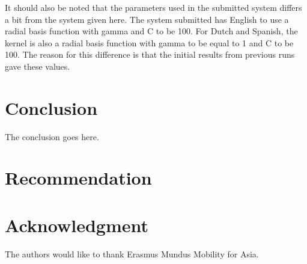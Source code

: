 \documentclass[conference]{IEEEtran}
\begin{document}
It should also be noted that the parameters used in the submitted system differs a bit from the system given here. The system submitted has English to use a radial basis function with gamma and C to be 100. For Dutch and Spanish, the kernel is also a radial basis function with gamma to be equal to 1 and C to be 100. The reason for this difference is that the initial results from previous runs gave these values. 




\section{Conclusion}
The conclusion goes here.

\section{Recommendation}





\section*{Acknowledgment}

The authors would like to thank Erasmus Mundus Mobility for Asia. 







%
%
%
%
{}

%
%




\end{document}
